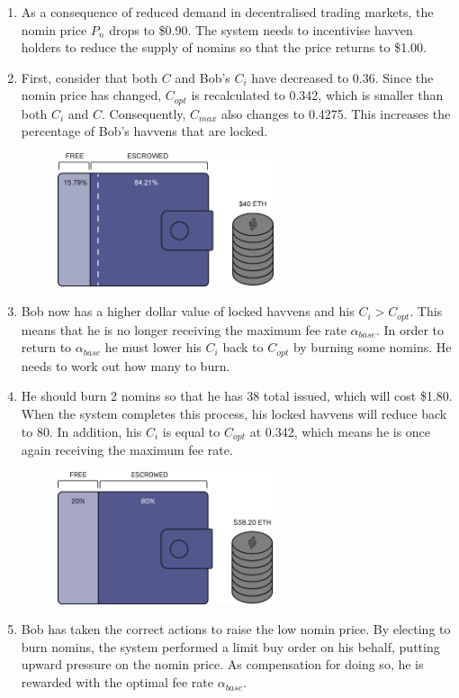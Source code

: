 \begin{enumerate}
\item{As a consequence of reduced demand in decentralised trading markets, the nomin price $P_n$ drops to \$0.90. The system needs to incentivise havven holders to reduce the supply of nomins so that the price returns to \$1.00.}
\item{First, consider that both $C$ and Bob's $C_i$ have decreased to 0.36. Since the nomin price has changed, $C_{opt}$ is recalculated to 0.342, which is smaller than both $C_i$ and $C$. Consequently, $C_{max}$ also changes to 0.4275. This increases the percentage of Bob's havvens that are locked.}
\begin{figure}[h!]
\centering
    \includegraphics[width=0.6\textwidth]{img/pn_drop}
\end{figure}
\item{Bob now has a higher dollar value of locked havvens and his $C_i > C_{opt}$. This means that he is no longer receiving the maximum fee rate $\alpha_{base}$. In order to return to $\alpha_{base}$ he must lower his $C_i$ back to $C_{opt}$ by burning some nomins. He needs to work out how many to burn.}
\item{He should burn 2 nomins so that he has 38 total issued, which will cost \$1.80. When the system completes this process, his locked havvens will reduce back to 80. In addition, his $C_i$ is equal to $C_{opt}$ at 0.342, which means he is once again receiving the maximum fee rate.}
\begin{figure}[h!]
\centering
    \includegraphics[width=0.6\textwidth]{img/post_burn}
\end{figure}
\item{Bob has taken the correct actions to raise the low nomin price. By electing to burn nomins, the system performed a limit buy order on his behalf, putting upward pressure on the nomin price. As compensation for doing so, he is rewarded with the optimal fee rate $\alpha_{base}$.}
\end{enumerate}

